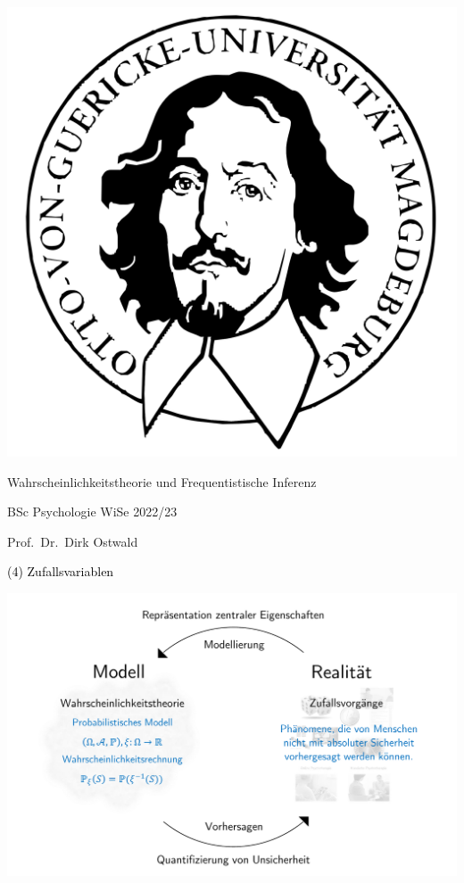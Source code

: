 \documentclass[
  8pt,
  ignorenonframetext,
]{beamer}
\author{}
\date{\vspace{-2.5em}}
\begin{document}
\begin{frame}[plain]{}
\protect\hypertarget{section}{}
\center

\begin{center}\includegraphics[width=0.2\linewidth]{4_Abbildungen/wtfi_4_otto} \end{center}

\vspace{2mm}

\Large

Wahrscheinlichkeitstheorie und Frequentistische Inferenz \vspace{6mm}

\large

BSc Psychologie WiSe 2022/23

\vspace{6mm}
\large

Prof.~Dr.~Dirk Ostwald
\end{frame}

\begin{frame}[plain]{}
\protect\hypertarget{section-1}{}
\vfill
\center
\huge

\textcolor{black}{(4) Zufallsvariablen} \vfill
\end{frame}

\begin{frame}{}
\protect\hypertarget{section-2}{}
\begin{center}\includegraphics[width=0.95\linewidth]{4_Abbildungen/wtfi_4_wahrscheinlichkeitstheorie_modell} \end{center}
\end{frame}
\end{document}
